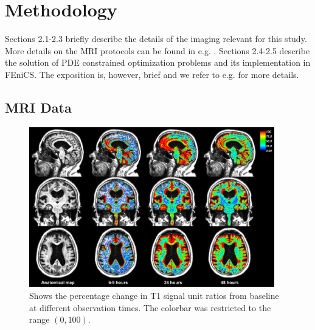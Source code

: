 \documentclass[12pt,a4paper]{article}
\begin{document}
\section{Methodology}

Sections 2.1-2.3 briefly describe the details of the imaging relevant for this study. More details on the MRI protocols can be
found in e.g. \cite{ringstad2018brain}. Sections 2.4-2.5 describe the solution of PDE constrained optimization problems and
its implementation in FEniCS. The exposition is, however, brief and we refer to e.g. \cite{hinze2008optimization} for more details. 



\subsection{MRI Data}
\begin{figure}
\includegraphics[width=0.95\textwidth]{../PatID-new-100.png} 
\caption{Shows the percentage change in T1 signal unit ratios from baseline at different observation times. The colorbar was restricted to the range $(0,100)$. }
\label{fig1} 
\end{figure}
\end{document}
